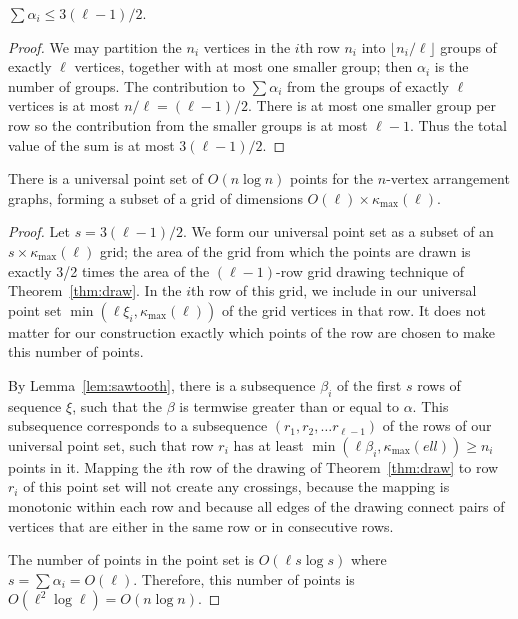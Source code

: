 \documentclass[oribibl]{llncs}
\newcommand{\maxklevel}{\kappa_{\max}}
\begin{document}
\begin{lemma}
$\sum\alpha_i\le 3(\ell-1)/2$.
\end{lemma}

\begin{proof}
We may partition the $n_i$ vertices in the $i$th row $n_i$ into $\lfloor n_i/\ell\rfloor$ groups of exactly $\ell$ vertices, together with at most one smaller group; then $\alpha_i$ is the number of groups. The contribution to $\sum\alpha_i$ from the groups of exactly $\ell$ vertices is at most $n/\ell=(\ell-1)/2$. There is at most one smaller group per row so the contribution from the smaller groups is at most $\ell-1$. Thus the total value of the sum is at most $3(\ell-1)/2$.
\end{proof}

\begin{theorem}
There is a universal point set of $O(n\log n)$ points for the $n$-vertex arrangement graphs,
forming a subset of a grid of dimensions $O(\ell)\times \maxklevel(\ell)$.
\end{theorem}

\begin{proof}
Let $s=3(\ell-1)/2$.
We form our universal point set as a subset of an $s\times\maxklevel(\ell)$ grid; the area of the grid from which the points are drawn is exactly 3/2 times the area of the $(\ell-1)$-row grid drawing technique of Theorem~\ref{thm:draw}. In the $i$th row of this grid, we include in our universal point set $\min(\ell\xi_i,\maxklevel(\ell))$ of the grid vertices in that row. It does not matter for our construction exactly which points of the row are chosen to make this number of points.

By Lemma~\ref{lem:sawtooth}, there is a subsequence $\beta_i$ of the first $s$ rows of sequence $\xi$, such that the $\beta$ is termwise greater than or equal to $\alpha$. This subsequence corresponds to a subsequence
$(r_1,r_2,\dots r_{\ell-1})$ of the rows of our universal point set, such that row $r_i$ has at least $\min(\ell\beta_i,\maxklevel(ell))\ge n_i$ points in it.
Mapping the $i$th row of the drawing of Theorem~\ref{thm:draw} to row $r_i$ of this point set will not create any crossings, because the mapping is monotonic within each row and because all edges of the drawing connect pairs of vertices that are either in the same row or in consecutive rows.

The number of points in the point set is $O(\ell s\log s)$ where $s=\sum\alpha_i=O(\ell)$.
Therefore, this number of points is $O(\ell^2\log\ell)=O(n\log n)$.
\end{proof}
\end{document}
